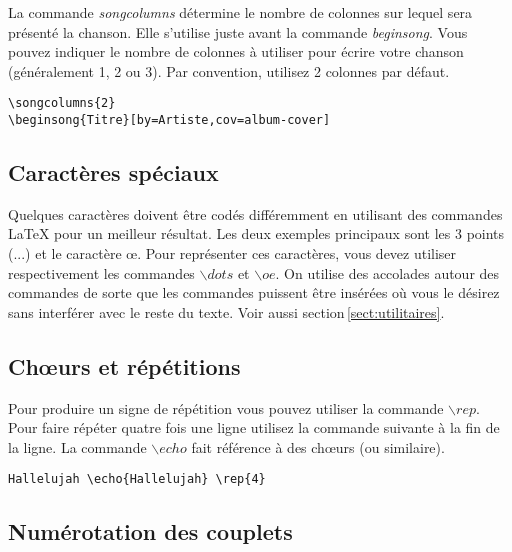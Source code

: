 \documentclass[a4paper,twoside]{article}
\begin{document}
La commande \emph{songcolumns} détermine le nombre de colonnes sur
lequel sera présenté la chanson. Elle s'utilise juste avant la
commande \emph{beginsong}. Vous pouvez indiquer le nombre de colonnes
à utiliser pour écrire votre chanson (généralement 1, 2 ou 3). Par
convention, utilisez 2 colonnes par défaut.

\begin{verbatim}
\songcolumns{2}
\beginsong{Titre}[by=Artiste,cov=album-cover]
\end{verbatim}

\subsection{Caractères spéciaux}

Quelques caractères doivent être codés différemment en utilisant des
commandes LaTeX pour un meilleur résultat. Les deux exemples
principaux sont les 3 points (...) et le caractère \oe{}. Pour
représenter ces caractères, vous devez utiliser respectivement les
commandes ${\backslash dots}$ et ${\backslash oe}$. On utilise des
accolades autour des commandes de sorte que les commandes puissent
être insérées où vous le désirez sans interférer avec le reste du
texte. Voir aussi section\,\ref{sect:utilitaires}.

\subsection{Ch\oe{}urs et répétitions}

Pour produire un signe de répétition vous pouvez utiliser la commande
$\backslash rep$. Pour faire répéter quatre fois une ligne utilisez la
commande suivante à la fin de la ligne. La commande $\backslash echo$
fait référence à des ch\oe{}urs (ou similaire).

\begin{verbatim}
Hallelujah \echo{Hallelujah} \rep{4}
\end{verbatim}

\subsection{Numérotation des couplets}
\end{document}
